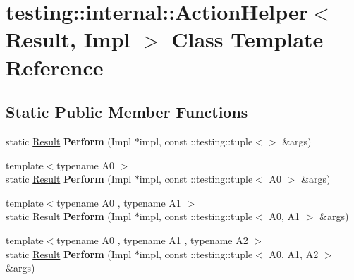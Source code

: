 \hypertarget{classtesting_1_1internal_1_1ActionHelper}{}\section{testing\+:\+:internal\+:\+:Action\+Helper$<$ Result, Impl $>$ Class Template Reference}
\label{classtesting_1_1internal_1_1ActionHelper}
\subsection*{Static Public Member Functions}
\begin{DoxyCompactItemize}
\item 
\mbox{\label{classtesting_1_1internal_1_1ActionHelper_a25176836b0a381d883d61c3a2dc60662}} 
static \hyperlink{classResult}{Result} {\bfseries Perform} (Impl $\ast$impl, const \+::testing\+::tuple$<$$>$ \&args)
\item 
\mbox{\label{classtesting_1_1internal_1_1ActionHelper_a08d2e199b0a3a1f9e05982cae07db3ec}} 
{\footnotesize template$<$typename A0 $>$ }\\static \hyperlink{classResult}{Result} {\bfseries Perform} (Impl $\ast$impl, const \+::testing\+::tuple$<$ A0 $>$ \&args)
\item 
\mbox{\label{classtesting_1_1internal_1_1ActionHelper_a96d8d8399ff3322e77ba1de51c166f4e}} 
{\footnotesize template$<$typename A0 , typename A1 $>$ }\\static \hyperlink{classResult}{Result} {\bfseries Perform} (Impl $\ast$impl, const \+::testing\+::tuple$<$ A0, A1 $>$ \&args)
\item 
\mbox{\label{classtesting_1_1internal_1_1ActionHelper_ad450478d185cbcac0e1383f7517f5c36}} 
{\footnotesize template$<$typename A0 , typename A1 , typename A2 $>$ }\\static \hyperlink{classResult}{Result} {\bfseries Perform} (Impl $\ast$impl, const \+::testing\+::tuple$<$ A0, A1, A2 $>$ \&args)
\item 
\mbox{\label{classtesting_1_1internal_1_1ActionHelper_a2ceda08aeb7b9fd1ad6ccb0821a3ea39}} 
$$
\end{DoxyCompactItemize}
